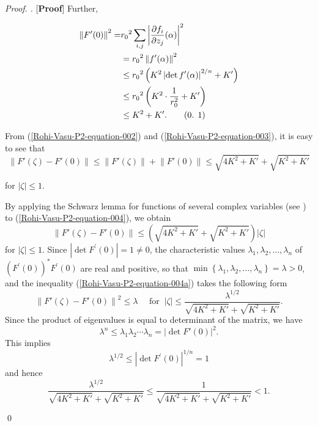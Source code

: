 \documentclass[a4paper,12pt,reqno]{amsart}
\theoremstyle{plain}
\newcommand\numberthis{\addtocounter{equation}{1}\tag{\theequation}}
\theoremstyle{definition}
\newenvironment{pf}[1][]{%
	\vskip 3mm
	\noindent
	\ifthenelse{\equal{#1}{}}%
	{{\slshape Proof. }}%
	{{\slshape #1.} }%
}%
{\qed\bigskip}
\renewcommand{\theequation}{\thesection.
\arabic{equation}}
\numberwithin{equation}{section}
\begin{document}
\begin{pf} [{\bf Proof}]
Further,

\begin{align*}\label{Rohi-Vasu-P2-equation-003}
\left\|F^{\prime}(0)\right\|^2=&{r_0}^2 \sum_{i, j}\left|\frac{\partial f_i}{\partial z_j}(\alpha)\right|^2 \\ &={r_0}^2\left\|f^{\prime}(\alpha)\right\|^2 \\
& \leq {r_0}^2\left(K^2\left|\operatorname{det} f'(\alpha)\right|^{2/n}+K'\right) \\
& \leq {r_0}^2\left(K^2 \cdot \frac{1}{r_0^2}+K'\right) \\
&\leq K^2+K'.\numberthis
\end{align*}
\vspace{2mm}

From (\ref{Rohi-Vasu-P2-equation-002}) and (\ref{Rohi-Vasu-P2-equation-003}), it is easy to see that
\begin{equation}\label{Rohi-Vasu-P2-equation-004}
\left\|F'(\zeta)-F'(0)\right\| \leq\left\|F'(\zeta)\right\|+\left\|F'(0)\right\| \leq \sqrt{4K^2+K'}+\sqrt{K^2+K'}
\end{equation}

for $\left|\zeta\right|\leq 1$.
\vspace{2mm}

By applying the Schwarz lemma for functions of several complex variables (see \cite{Bochner-Martin-1948}) to (\ref{Rohi-Vasu-P2-equation-004}), we obtain
\begin{equation}\label{Rohi-Vasu-P2-equation-004a}
\left\|F'(\zeta)-F'(0)\right\| \leq \left(\sqrt{4K^2+K'}+\sqrt{K^2+K'}\right)|\zeta|
\end{equation}
for $|\zeta|\leq 1.$ Since $\left|\operatorname{det} F^{\prime}(0)\right|=1 \neq 0$, the characteristic values $\lambda_1, \lambda_2, \ldots, \lambda_n$ of $\left(F^{\prime}(0)\right)^* F^{\prime}(0)$ are real and positive, so that $\min \left\{\lambda_1, \lambda_2, \ldots, \lambda_n\right\}=\lambda>0$, and the inequality (\ref{Rohi-Vasu-P2-equation-004a}) takes the following form
\begin{equation}\label{Rohi-Vasu-P2-equation-005}
\left\|F'(\zeta)-F'(0)\right\|^2 \leq \lambda \quad \text { for }\ |\zeta| \leq \frac{\lambda^{1 / 2}}{\sqrt{4K^2+K'}+\sqrt{K^2+K'}}.
\end{equation}
Since the product of eigenvalues is equal to determinant of the matrix, we have
$$
 \lambda^n \leq \lambda_1 \lambda_2 \cdots \lambda_n=|\operatorname{det} F'(0)|^2. $$
 This implies 
 $$
 \lambda^{1 / 2} \leq\left|\operatorname{det} F^{\prime}(0)\right|^{1 / n}=1
$$
and hence
\begin{equation}\label{Rohi-Vasu-P2-equation-006}
  \frac{{\lambda}^{1/2}}{\sqrt{4K^2+K'}+\sqrt{K^2+K'}}\leq \frac{1}{\sqrt{4K^2+K'}+\sqrt{K^2+K'}}<1.
\end{equation}


\end{pf}
\end{document}
